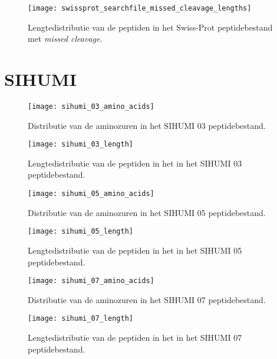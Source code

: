 \begin{figure}[H]
    \centering
    \texttt{[image: swissprot\_searchfile\_missed\_cleavage\_lengths]}
    \caption{Lengtedistributie van de peptiden in het Swiss-Prot peptidebestand met \textit{missed cleavage.}}
    \label{fig:swissprot_search_missed_cleavage_distr}
\end{figure}

\section{SIHUMI}\label{sec:sihumi-stats}

\begin{figure}[H]
    \centering
    \texttt{[image: sihumi\_03\_amino\_acids]}
    \caption{Distributie van de aminozuren in het SIHUMI 03 peptidebestand.}
    \label{fig:sihumi_03_amino_acids}
\end{figure}

\begin{figure}[H]
    \centering
    \texttt{[image: sihumi\_03\_length]}
    \caption{Lengtedistributie van de peptiden in het in het SIHUMI 03 peptidebestand.}
    \label{fig:sihumi_03_distr}
\end{figure}

\begin{figure}[H]
    \centering
    \texttt{[image: sihumi\_05\_amino\_acids]}
    \caption{Distributie van de aminozuren in het SIHUMI 05 peptidebestand.}
    \label{fig:sihumi_05_amino_acids}
\end{figure}

\begin{figure}[H]
    \centering
    \texttt{[image: sihumi\_05\_length]}
    \caption{Lengtedistributie van de peptiden in het in het SIHUMI 05 peptidebestand.}
    \label{fig:sihumi_05_distr}
\end{figure}

\begin{figure}[H]
    \centering
    \texttt{[image: sihumi\_07\_amino\_acids]}
    \caption{Distributie van de aminozuren in het SIHUMI 07 peptidebestand.}
    \label{fig:sihumi_07_amino_acids}
\end{figure}

\begin{figure}[H]
    \centering
    \texttt{[image: sihumi\_07\_length]}
    \caption{Lengtedistributie van de peptiden in het in het SIHUMI 07 peptidebestand.}
    \label{fig:sihumi_07_distr}
\end{figure}

